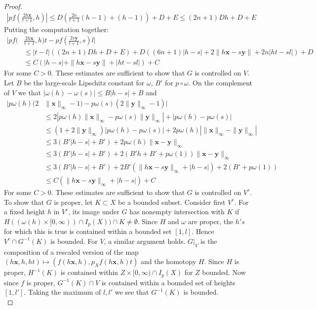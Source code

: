 \documentclass[a4paper,11pt]{article}
\theoremstyle{definition}
\theoremstyle{plain}
\theoremstyle{remark}
\begin{document}
\begin{proof}
\begin{align*}
|pf(\frac{2h\mathbf{x}}{t+1},h)| \leq D(\frac{2n}{t+1}(h-1)+(h-1)) + D + E \leq (2n+1)Dh + D+E
\end{align*}
Putting the computation together:
\begin{align*}
|pf(&\frac{2h\mathbf{x}}{t+1},h)t-pf(\frac{2s\mathbf{y}}{l+1},s)l| \\
&\leq  |t-l|((2n+1)Dh + D+E) +  D((6n+1)|h-s|+2\|h\mathbf{x}-s \mathbf{y}\|+2n |ht-sl|) +D\\
&\leq C(|h-s|+\| h\mathbf{x}-s\mathbf{y}\| + |ht-sl|) +C
\end{align*}
For some $C>0$. These estimates are sufficient to show that $G$ is controlled on $V$. \\

Let $B$ be the large-scale Lipschitz constant for $\omega$, $B'$ for $p\circ \omega$. On the complement of $V$ we that $|\omega(h)-\omega(s)| \leq B |h-s| + B$ and 
\begin{align*}
|p\omega(h)(2&\|\mathbf{x}\|_{\infty}-1) - p\omega(s)(2\|\mathbf{y}\|_{\infty}-1)| \\
&\leq 2|p\omega(h)\|\mathbf{x}\|_{\infty}-p\omega(s)\|\mathbf{y}\|_{\infty}|+|p\omega(h)-p\omega(s)| \\
&\leq (1+2\|\mathbf{y}\|_{\infty})|p\omega(h)-p\omega(s)| +  2p\omega(h)|\|\mathbf{x}\|_{\infty}-\|\mathbf{y}\|_{\infty}| \\
&\leq 3(B'|h-s|+B') +2p\omega(h) \|\mathbf{x}-\mathbf{y}\|_{\infty}\\
&\leq 3(B'|h-s|+B') +2(B'h+B'+p\omega(1)) \|\mathbf{x}-\mathbf{y}\|_{\infty}\\
&\leq 3(B'|h-s|+B') +2B'(\|h\mathbf{x}-s\mathbf{y}\|_{\infty}+|h-s|)+2(B'+p\omega(1))\\
&\leq C(\|h\mathbf{x}-s\mathbf{y}\|_{\infty}+|h-s|)+C
\end{align*}
For some $C>0$. These estimates are sufficient to show that $G$ is controlled on $V^{c}$.\\

To show that $G$ is proper, let $K\subset X$ be a bounded subset. Consider first $V^c$. For a fixed height $h$ in $V^c$, its image under $G$ has nonempty intersection with $K$ if $H((\omega(h)\times [0,\infty)) \cap I_{p}(X)) \cap K \neq \emptyset$. Since $H$ and $\omega$ are proper, the $h's$ for which this is true is contained within a bounded set $[1,l]$. Hence $V^c \cap G^{-1}(K)$ is bounded. For $V$, a similar argument holds. $G|_V$ is the composition of a rescaled version of the map $(h\mathbf{x},h,ht)\mapsto (f(h\mathbf{x},h),p_{X}f(h\mathbf{x},h)t)$ and the homotopy $H$. Since $H$ is proper, $H^{-1}(K)$ is contained within $Z\times [0,\infty)\cap I_{p}(X)$ for $Z$ bounded. Now since $f$ is proper, $G^{-1}(K)\cap V$ is contained within a bounded set of heights $[1,l']$. Taking the maximum of $l,l'$ we see that $G^{-1}(K)$ is bounded. \\ 


\end{proof}
\end{document}
